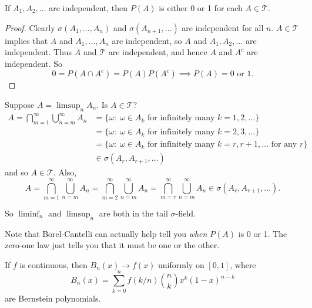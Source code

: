 \documentclass[11pt,fleqn]{book} %
\begin{document}
\begin{theorem} \label{thm:zero-one}
	If $A_1,A_2,\dots$ are independent, then $P(A)$ is either 0 or 1 for each $A \in \mathcal{T}$.
\end{theorem}

\begin{proof}
	Clearly $\sigma(A_1,\dots,A_n)$ and $\sigma(A_{n+1},\dots)$ are independent for all $n$. $A \in \mathcal{T}$ implies that $A$ and $A_1,\dots,A_n$ are independent, so $A$ and $A_1,A_2,\dots$ are independent. Thus $A$ and $\mathcal{T}$ are independent, and hence $A$ and $A^c$ are independent. So
	\[
		0 = P(A \cap A^c) = P(A)P(A^c) \implies P(A) = 0 \textrm{ or } 1.
	\]
\end{proof}

Suppose $A = \limsup_n A_n$. Is $A \in \mathcal{T}$?
\begin{align*}
	A = \bigcap_{m=1}^\infty \bigcup_{n=m}^\infty A_n &= \{\omega:\;\omega \in A_k \textrm{ for infinitely many } k=1,2,\dots\} \\
	&= \{\omega:\;\omega \in A_k \textrm{ for infinitely many } k=2,3,\dots\} \\
	&= \{\omega:\;\omega \in A_k \textrm{ for infinitely many } k=r,r+1,\dots \textrm{ for any } r\} \\
	&\in \sigma(A_r,A_{r+1},\dots)
\end{align*}
and so $A \in \mathcal{T}$. Also,
\[
	A = \bigcap_{m=1}^\infty \bigcup_{n=m}^\infty A_n = \bigcap_{m=2}^\infty \bigcup_{n=m}^\infty A_n = \bigcap_{m=r}^\infty \bigcup_{n=m}^\infty A_n \in \sigma(A_r,A_{r+1},\dots).
\]

So $\liminf_n$ and $\limsup_n$ are both in the tail $\sigma$-field.

Note that Borel-Cantelli can actually help tell you \emph{when} $P(A)$ is 0 or 1. The zero-one law just tells you that it must be one or the other.

\begin{theorem} \label{thm:bernstein}
	If $f$ is continuous, then $B_n(x) \to f(x)$ uniformly on $[0,1]$, where
	\[
		B_n(x) = \sum_{k=0}^n f(k/n) {n \choose k} x^k (1-x)^{n-k}
	\]
	are Bernstein polynomials.
\end{theorem}
\end{document}
